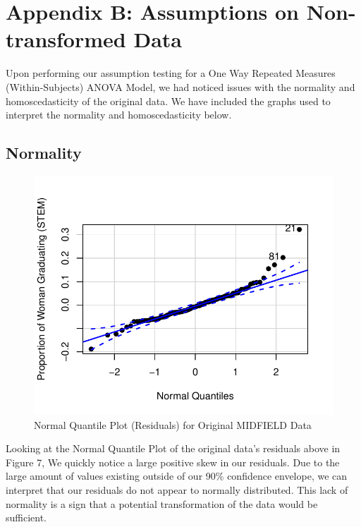 \documentclass[]{article}
\begin{document}
\newpage

\section{Appendix B: Assumptions on Non-transformed
Data}\label{appendix-b-assumptions-on-non-transformed-data}

Upon performing our assumption testing for a One Way Repeated Measures
(Within-Subjects) ANOVA Model, we had noticed issues with the normality
and homoscedasticity of the original data. We have included the graphs
used to interpret the normality and homoscedasticity below.

\subsection{Normality}\label{normality}

\begin{figure}
\centering
\includegraphics{Stat_461_Final_Project_Report_files/figure-latex/normality-1.pdf}
\caption{Normal Quantile Plot (Residuals) for Original MIDFIELD Data}
\end{figure}

Looking at the Normal Quantile Plot of the original data's residuals
above in Figure 7, We quickly notice a large positive skew in our
residuals. Due to the large amount of values existing outside of our
90\% confidence envelope, we can interpret that our residuals do not
appear to normally distributed. This lack of normality is a sign that a
potential transformation of the data would be sufficient.
\end{document}
